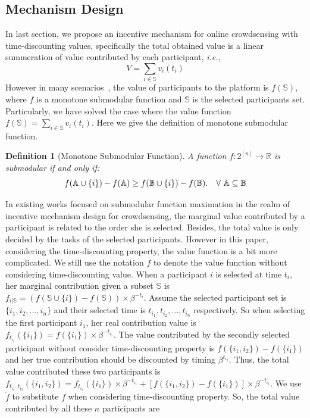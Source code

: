 \documentclass[10pt,journal,letterpaper,compsoc]{IEEEtran}
\newtheorem{definition}{Definition}
\newcommand{\ie}{{\em i.e.}}
\begin{document}
\subsection{Mechanism Design}
In last section, we propose an incentive mechanism for online crowdsensing with time-discounting values, specifically the total obtained value is a linear summeration of value contributed by each participant, \ie,
\begin{equation}
V=\sum\limits_{i \in \mathbb{S}}v_i(t_i)
\end{equation}
However in many scenarios~\cite{zhao2014crowdsource}, the value of participants to the platform is $f(\mathbb{S})$, where $f$ is a monotone submodular function and $\mathbb{S}$ is the selected participants set. Particularly, we have solved the case where the value function $f(\mathbb{S})=\sum\limits_{i \in \mathbb{S}}v_i(t_i)$. Here we give the definition of monotone submodular function.
\begin{definition}[Monotone Submodular Function]
A function $f:2^{[n]}\to \mathbb{R}$ is submodular if and only if:
\begin{equation}
f(\mathbb{A}\cup\{i\})-f(\mathbb{A})\ge f(\mathbb{B}\cup \{i\})-f(\mathbb{B}). \quad \forall\ \mathbb{A}\subseteq\mathbb{B} \notag
\end{equation}
\end{definition}
In existing works focused on submodular function maximation in the realm of incentive mechanism design for crowdsensing, the marginal value contributed by a participant is related to the order she is selected. Besides, the total value is only decided by the tasks of the selected participants. However in this paper, considering the time-discounting property, the value function is a bit more complicated. We still use the notation $f$ to denote the value function without considering time-discounting value. When a participant $i$ is selected at time $t_i$, her marginal contribution given a subset $\mathbb{S}$ is $f_{i|\mathbb{S}}=(f(\mathbb{S}\cup\{i\})-f(\mathbb{S}))\times\beta ^{-t_i}$.
Assume the selected participant set is $\{i_1,i_2,...,i_n\}$ and their selected time is $t_{i_1},t_{i_2},...,t_{i_n}$ respectively. So when selecting the first participant $i_1$, her real contribution value is $f_{t_{i_1}}(\{i_1\})=f(\{i_1\})\times \beta^{-t_{i_1}}$. The value contributed by the secondly selected participant without consider time-discounting property is $f(\{i_1,i_2\})-f(\{i_1\})$ and her true contribution should be discounted by timing $\beta^{t_{i_2}}$. Thus, the total value contributed these two participants is $f_{t_{i_1},t_{i_2}}(\{i_1,i_2\}) = f_{t_{i_1}}(\{i_1\})\times \beta^{-t_{i_1}} + [f(\{i_1,i_2\})-f(\{i_1\})]\times\beta^{-t_{i_1}}$. We use $\tilde{f}$ to substitute $f$ when considering time-discounting property. So, the total value contributed by all these $n$ participants are
\end{document}
